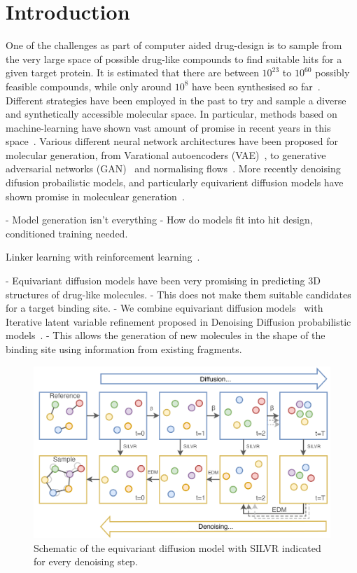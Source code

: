 \documentclass[journal=jacsat,manuscript=article]{achemso}
\begin{document}
\section{Introduction}
\label{sec:intro}
One of the challenges as part of computer aided drug-design is to sample from the very large space of possible drug-like compounds to find suitable hits for a given target protein. It is estimated that there are between $10^{23}$ to $10^{60}$ possibly feasible compounds, while only around $10^8$ have been synthesised so far~\cite{polishchuk2013estimation, reymond2012exploring}. Different strategies have been employed in the past to try and sample a diverse and synthetically accessible molecular space. In particular, methods based on machine-learning have shown vast amount of promise in recent years in this space~\cite{bilodeau2022generative}. Various different neural network architectures have been proposed for molecular generation, from Varational autoencoders (VAE)~\cite{kingma2022autoencoding, jin2018junction, ma2018constrained}, to generative adversarial networks (GAN)~\cite{hoffmann2019generating} and normalising flows~\cite{shi2021learning}. More recently denoising difusion probailistic models, and particularly equivarient diffusion models have shown promise in moleculear generation~\cite{xu2022geodiff, hoogeboom2022equivariant}.  

- Model generation isn't everything
- How do models fit into hit design, conditioned training needed.


Linker learning with reinforcement learning~\cite{guo2023linkinvent}.

- Equivariant diffusion models have been very promising in predicting 3D structures of drug-like molecules. 
- This does not make them suitable candidates for a target binding site. 
- We combine equivariant diffusion models~\cite{huang2022mdm} with Iterative latent variable refinement proposed in Denoising Diffusion probabilistic models~\cite{choi2021ilvr}.
- This allows the generation of new molecules in the shape of the binding site using information from existing fragments.
\begin{figure}
    \centering
    \includegraphics[width=\textwidth]{paper/Figures/Fig1/Schematic.png}
    \caption{Schematic of the equivariant diffusion model with  SILVR indicated for every denoising step.}
    \label{fig:schematic}
\end{figure}
\end{document}
